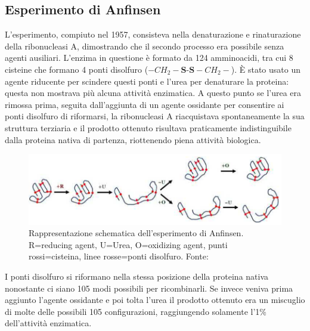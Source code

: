 \subsection{Esperimento di Anfinsen}
L'esperimento, compiuto nel 1957\supercite{anfinsen1961kinetics}, consisteva nella denaturazione e rinaturazione della ribonucleasi A, dimostrando che il secondo processo era possibile senza agenti ausiliari. L'enzima in questione è formato da 124 amminoacidi, tra cui 8 cisteine che formano 4 ponti disolfuro ($-CH_{2}-\textbf{S-S}-CH_{2}-$). È stato usato un agente riducente per scindere questi ponti e l'urea per denaturare la proteina: questa non mostrava più alcuna attività enzimatica. A questo punto se l'urea era rimossa prima, seguita dall'aggiunta di un agente ossidante per consentire ai ponti disolfuro di riformarsi, la ribonucleasi A riacquistava spontaneamente la sua struttura terziaria e il prodotto ottenuto risultava praticamente indistinguibile dalla proteina nativa di partenza, riottenendo piena attività biologica. 

\begin{figure}[h]
	\centering
	\includegraphics[scale=0.6]{images/anfinsen-experiment.png}
	\caption{Rappresentazione schematica dell'esperimento di Anfinsen. R=reducing agent, U=Urea, O=oxidizing agent, punti rossi=cisteina, linee rosse=ponti disolfuro. Fonte: \cite{pal2019fundamentals}}
	\label{fig:anfinsen-exp}
\end{figure}

I ponti disolfuro si riformano nella stessa posizione della proteina nativa nonostante ci siano 105 modi possibili per ricombinarli. Se invece veniva prima aggiunto l'agente ossidante e poi tolta l'urea il prodotto ottenuto era un miscuglio di molte delle possibili 105 configurazioni, raggiungendo solamente l'1\% dell'attività enzimatica.

